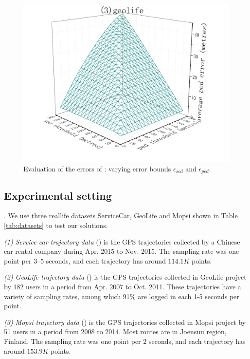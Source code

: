 \begin{figure}[tb!]
	\includegraphics[scale = 0.56]{figures/Fig-BITT-geolife-ped-error.png}\hspace{1ex}
	\vspace{-2ex}
	\caption{\small Evaluation of the \ped errors of \bitt: varying error bounds $\epsilon_{sed}$ and $\epsilon_{ped}$.}
	\label{fig:bitt-ped-error}
	\vspace{-1ex}
\end{figure}

\subsection{Experimental setting}

. We use three reallife datasets ServiceCar, GeoLife and Mopsi shown in Table \ref{tab:datasets} to test our solutions.

\vspace{0.5ex}
\ni \emph{(1) Service car trajectory data} (\sercar) is the GPS trajectories collected by a Chinese car rental company during Apr. 2015 to Nov. 2015. The sampling rate was one point per $3$--$5$ seconds, and
each trajectory has around $114.1K$ points.

\vspace{0.5ex}
\ni \emph{(2) GeoLife trajectory data} (\geolife) is the GPS trajectories collected in GeoLife project by 182 users in a period from Apr. 2007 to Oct. 2011. These trajectories have a variety of sampling rates, among which 91\% are logged in each 1-5 seconds per point. %

\vspace{0.5ex}
\ni \emph{(3) Mopsi trajectory data} (\mopsi) is the GPS trajectories collected in Mopsi project by 51 users in a period from 2008 to 2014. Most routes are in Joensuu region, Finland.
The sampling rate was one point per $2$ seconds, and each trajectory has around $153.9K$ points.

